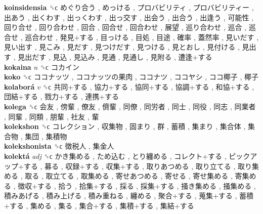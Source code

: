 \textbf{koinsidensia} ␝ϲ   めぐり合う ,  めっける ,  プロバビリティ ,  プロバビリティー ,  出あう ,  出くわす ,  出っくわす ,  出っ交す ,  出会う ,  出合う ,  出逢う ,  可能性 ,  回り合せ ,  回り合わせ ,  回合 ,  回合せ ,  回合わせ ,  展望 ,  巡り合わせ ,  巡合 ,  巡合せ ,  巡合わせ ,  発見+する ,  目っける ,  目処 ,  目途 ,  確率 ,  蓋然率 ,  見いだす ,  見い出す ,  見こみ ,  見だす ,  見つけだす ,  見つける ,  見とおし ,  見付ける ,  見出す ,  見出だす ,  見込 ,  見込み ,  見通 ,  見通し ,  見附る ,  遭逢+する   \\
\textbf{kokaina} \emph{n}  ␝ϲ   コカイン   \\
\textbf{koko} ␝ϲ   ココナッツ ,  ココナッツの果肉 ,  ココナツ ,  ココヤシ ,  ココ椰子 ,  椰子   \\
\textbf{kolaborá} \emph{v}  ␝ϲ   共同+する ,  協力+する ,  協同+する ,  協調+する ,  和協+する ,  団結+する ,  戮力+する ,  連携+する   \\
\textbf{kolega} ␝ϲ   会友 ,  傍輩 ,  僚友 ,  儕輩 ,  同僚 ,  同労者 ,  同士 ,  同役 ,  同志 ,  同業者 ,  同輩 ,  同類 ,  朋輩 ,  社友 ,  輩   \\
\textbf{kolekshon} ␝ϲ   コレクション ,  収集物 ,  固まり ,  群 ,  蓄積 ,  集まり ,  集合体 ,  集合物 ,  集団 ,  集積物   \\
\textbf{kolekshonista} ␝ϲ   徴税人 ,  集金人   \\
\textbf{kolektá} \emph{adj}  ␝ϲ   かき集める ,  ため込む ,  とり纏める ,  コレクト+する ,  ピックアップ+する ,  募る ,  収録+する ,  収集+する ,  取りあつめる ,  取り立てる ,  取り集める ,  取る ,  取立てる ,  取集める ,  寄せあつめる ,  寄せる ,  寄せ集める ,  寄集める ,  徴収+する ,  拾う ,  拾集+する ,  採る ,  採集+する ,  掻き集める ,  掻集める ,  積みあげる ,  積み上げる ,  積み重ねる ,  纏める ,  聚合+する ,  蒐集+する ,  蓄積+する ,  集める ,  集る ,  集合+する ,  集積+する ,  集結+する   \\
